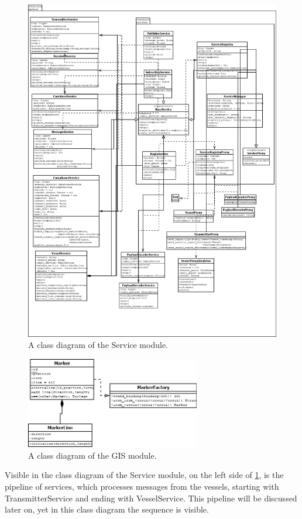 \documentclass[12pt]{article}
\begin{document}
\begin{figure}
  \centering
  \includegraphics[width=5in]{lib_service_total}
  \caption{A class diagram of the Service module.}
  \label{lib_service_total}
\end{figure}

\begin{figure}
  \centering
  \includegraphics[width=3in]{lib_gis_total}
  \caption{A class diagram of the GIS module.}
  \label{lib_gis_total}
\end{figure}

Visible in the class diagram of the Service module, on the left side of \ref{lib_service_total}, is the pipeline of services, which processes messages from the vessels, starting with TransmitterService and ending with VesselService. This pipeline will be discussed later on, yet in this class diagram the sequence is visible.
\end{document}
